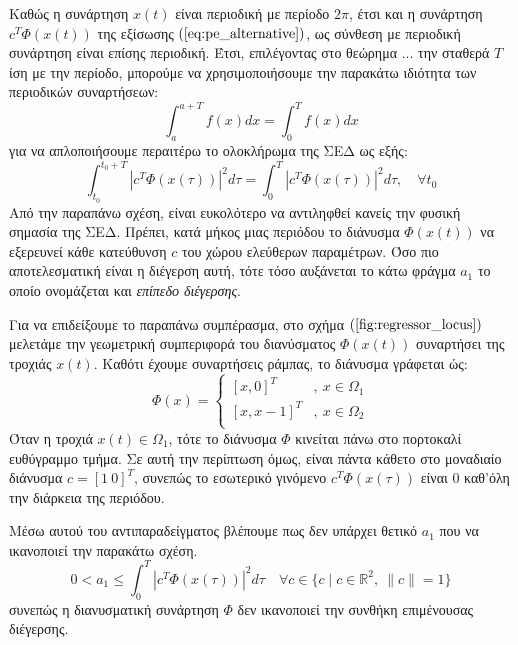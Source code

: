 Καθώς η συνάρτηση $x(t)$ είναι περιοδική με περίοδο $2\pi$, έτσι και η συνάρτηση $c^T \varPhi(x(t))$ της εξίσωσης $(\ref{eq:pe_alternative})$, ως σύνθεση με περιοδική συνάρτηση είναι επίσης περιοδική. Έτσι, επιλέγοντας στο θεώρημα ... την σταθερά $T$ ίση με την περίοδο, μπορούμε να χρησιμοποιήσουμε την παρακάτω ιδιότητα των περιοδικών συναρτήσεων:
\begin{equation*}
	\int_{a}^{a+T} f(x) dx = \int_{0}^{T} f(x) dx
\end{equation*}
για να απλοποιήσουμε περαιτέρω το ολοκλήρωμα της ΣΕΔ ως εξής:
\begin{equation*}
\int_{t_0}^{t_0 + T} \left| c^T \varPhi(x(\tau)) \right|^2 d\tau = 
\int_{0}^{T} \left| c^T \varPhi(x(\tau)) \right|^2 d\tau, \quad \forall t_0
\end{equation*}
Από την παραπάνω σχέση, είναι ευκολότερο να αντιληφθεί κανείς την φυσική σημασία της ΣΕΔ. Πρέπει, κατά μήκος μιας περιόδου το διάνυσμα $\varPhi(x(t))$ να εξερευνεί κάθε κατεύθυνση $c$ του χώρου ελεύθερων παραμέτρων. Όσο πιο αποτελεσματική είναι η διέγερση αυτή, τότε τόσο αυξάνεται το κάτω φράγμα $a_1$ το οποίο ονομάζεται και \textit{επίπεδο διέγερσης}.

Για να επιδείξουμε το παραπάνω συμπέρασμα, στο σχήμα $(\ref{fig:regressor_locus})$ μελετάμε την γεωμετρική συμπεριφορά του διανύσματος $\varPhi(x(t))$ συναρτήσει της τροχιάς $x(t)$. Καθότι έχουμε συναρτήσεις ράμπας, το διάνυσμα γράφεται ώς:
\begin{equation*}
	\varPhi(x) = 
	\begin{cases}
	[x, 0]^T    &, \: x \in \Omega_1\\
	[x,x-1]^T &, \: x \in \Omega_2\\
	\end{cases}
\end{equation*}
Όταν η τροχιά $x(t) \in \Omega_1$, τότε το διάνυσμα $\varPhi$ κινείται πάνω στο πορτοκαλί ευθύγραμμο τμήμα. Σε αυτή την περίπτωση όμως, είναι πάντα κάθετο στο μοναδιαίο διάνυσμα $c = [ 1 \: 0 ]^T$, συνεπώς το εσωτερικό γινόμενο $c^T \varPhi(x(\tau))$ είναι $0$ καθ'όλη την διάρκεια της περιόδου. 

Μέσω αυτού του αντιπαραδείγματος βλέπουμε πως δεν υπάρχει θετικό $a_1$ που να ικανοποιεί την παρακάτω σχέση.
\begin{equation*}
	0 < a_1 \leq \int_{0}^{T} \left| c^T \varPhi(x(\tau)) \right|^2 d\tau \quad
	\forall c \in
	\{c \mid c \in \mathbb{R}^2, \: \|c\| =1 \}
\end{equation*}
συνεπώς η διανυσματική συνάρτηση $\varPhi$ δεν ικανοποιεί την συνθήκη επιμένουσας διέγερσης.


